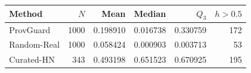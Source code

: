 \begin{tabular}{@{}lrrrrr@{}}
\toprule
Method & $N$ & Mean & Median & $Q_3$ & $h>0.5$ \\
\midrule
ProvGuard & 1000 & 0.198910 & 0.016738 & 0.330759 & 172 \\
Random-Real & 1000 & 0.058424 & 0.000903 & 0.003713 & 53 \\
Curated-HN & 343 & 0.493198 & 0.651523 & 0.670925 & 195 \\
\bottomrule
\end{tabular}
